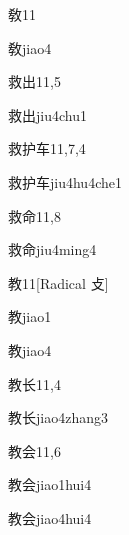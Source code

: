 \begin{entry}{敎}{11}
  \begin{phonetics}{敎}{jiao4}
  \end{phonetics}
\end{entry}

\begin{entry}{救出}{11,5}
  \begin{phonetics}{救出}{jiu4chu1}
  \end{phonetics}
\end{entry}

\begin{entry}{救护车}{11,7,4}
  \begin{phonetics}{救护车}{jiu4hu4che1}
  \end{phonetics}
\end{entry}

\begin{entry}{救命}{11,8}
  \begin{phonetics}{救命}{jiu4ming4}
  \end{phonetics}
\end{entry}

\begin{entry}{教}{11}[Radical 攴]
  \begin{phonetics}{教}{jiao1}
  \end{phonetics}
  \begin{phonetics}{教}{jiao4}
  \end{phonetics}
\end{entry}

\begin{entry}{教长}{11,4}
  \begin{phonetics}{教长}{jiao4zhang3}
  \end{phonetics}
\end{entry}

\begin{entry}{教会}{11,6}
  \begin{phonetics}{教会}{jiao1hui4}
  \end{phonetics}
  \begin{phonetics}{教会}{jiao4hui4}
  \end{phonetics}
\end{entry}

